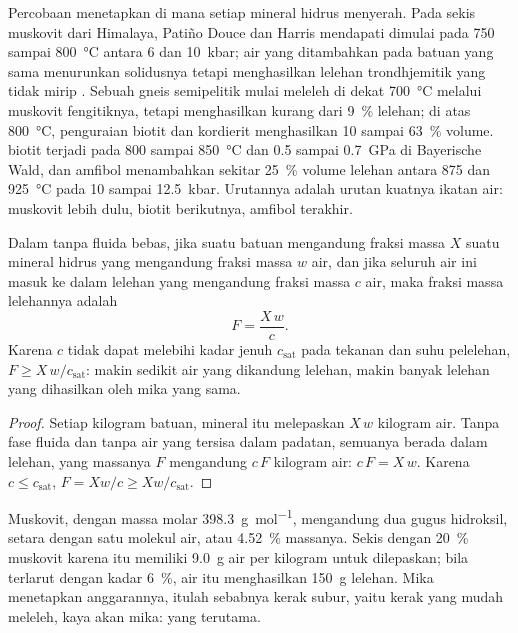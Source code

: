 Percobaan menetapkan di mana setiap mineral hidrus menyerah. Pada sekis muskovit dari
Himalaya, Patiño Douce dan Harris mendapati  dimulai pada 750 sampai
\qty{800}{\celsius} antara 6 dan \qty{10}{kbar}; air yang ditambahkan pada batuan yang sama menurunkan
solidusnya tetapi menghasilkan lelehan trondhjemitik yang tidak mirip . Sebuah gneis semipelitik
mulai meleleh di dekat \qty{700}{\celsius} melalui muskovit fengitiknya, tetapi menghasilkan kurang
dari \qty{9}{\percent} lelehan; di atas \qty{800}{\celsius}, penguraian biotit dan
kordierit menghasilkan 10 sampai \qty{63}{\percent} volume.  biotit terjadi
pada 800 sampai \qty{850}{\celsius} dan 0.5 sampai \qty{0.7}{GPa} di 
Bayerische Wald, dan amfibol menambahkan sekitar \qty{25}{\percent} volume lelehan antara 875
dan \qty{925}{\celsius} pada 10 sampai \qty{12.5}{kbar}. Urutannya adalah urutan kuatnya ikatan air:
muskovit lebih dulu, biotit berikutnya, amfibol terakhir.

\begin{proposition}\label{prop:b2:crustal-melting:water}
Dalam  tanpa fluida bebas, jika suatu batuan mengandung fraksi massa $X$ suatu
mineral hidrus yang mengandung fraksi massa $w$ air, dan jika seluruh air ini masuk ke dalam
lelehan yang mengandung fraksi massa $c$ air, maka fraksi massa lelehannya adalah
\[F = \frac{X\,w}{c}.\]
Karena $c$ tidak dapat melebihi kadar jenuh $c_{\mathrm{sat}}$ pada tekanan dan
suhu pelelehan, $F \ge X\,w/c_{\mathrm{sat}}$: makin sedikit air yang dikandung lelehan, makin
banyak lelehan yang dihasilkan oleh mika yang sama.
\end{proposition}

\begin{proof}
Setiap kilogram batuan, mineral itu melepaskan $X\,w$ kilogram air. Tanpa fase fluida
dan tanpa air yang tersisa dalam padatan, semuanya berada dalam lelehan, yang massanya $F$ mengandung $c\,F$
kilogram air: $c\,F = X\,w$. Karena $c \le c_{\mathrm{sat}}$, $F = Xw/c \ge
Xw/c_{\mathrm{sat}}$.
\end{proof}

Muskovit,  dengan massa molar \qty{398.3}{\gram\per\mole}, mengandung dua
gugus hidroksil, setara dengan satu molekul air, atau \qty{4.52}{\percent} massanya.
Sekis dengan \qty{20}{\percent} muskovit karena itu memiliki \qty{9.0}{\gram} air
per kilogram untuk dilepaskan; bila terlarut dengan kadar \qty{6}{\percent}, air itu menghasilkan \qty{150}{\gram}
lelehan. Mika menetapkan anggarannya, itulah sebabnya kerak subur, yaitu kerak yang mudah meleleh,
kaya akan mika:  yang terutama.

